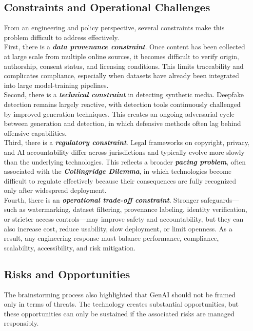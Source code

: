 \subsection{Constraints and Operational Challenges}
From an engineering and policy perspective, several constraints make this problem difficult to address effectively. \\

First, there is a \textbf{\textit{data provenance constraint}}. Once content has been collected at large scale from multiple online sources, it becomes difficult to verify origin, authorship, consent status, and licensing conditions. This limits traceability and complicates compliance, especially when datasets have already been integrated into large model-training pipelines. \\

Second, there is a \textbf{\textit{technical constraint}} in detecting synthetic media. Deepfake detection remains largely reactive, with detection tools continuously challenged by improved generation techniques. This creates an ongoing adversarial cycle between generation and detection, in which defensive methods often lag behind offensive capabilities. \\

Third, there is a \textbf{\textit{regulatory constraint}}. Legal frameworks on copyright, privacy, and AI accountability differ across jurisdictions and typically evolve more slowly than the underlying technologies. This reflects a broader \textbf{\textit{pacing problem}}, often associated with the \textbf{\textit{Collingridge Dilemma}}, in which technologies become difficult to regulate effectively because their consequences are fully recognized only after widespread deployment. \\

Fourth, there is an \textbf{\textit{operational trade-off constraint}}. Stronger safeguards---such as watermarking, dataset filtering, provenance labeling, identity verification, or stricter access controls---may improve safety and accountability, but they can also increase cost, reduce usability, slow deployment, or limit openness. As a result, any engineering response must balance performance, compliance, scalability, accessibility, and risk mitigation.

\subsection{Risks and Opportunities}
The brainstorming process also highlighted that GenAI should not be framed only in terms of threats. The technology creates substantial opportunities, but these opportunities can only be sustained if the associated risks are managed responsibly. \\

